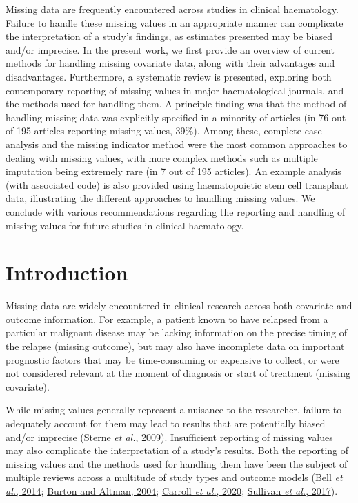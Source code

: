 \documentclass[
  letterpaper,
  DIV=11,
  numbers=noendperiod]{scrreprt}
\begin{document}
Missing data are frequently encountered across studies in clinical
haematology. Failure to handle these missing values in an appropriate
manner can complicate the interpretation of a study's findings, as
estimates presented may be biased and/or imprecise. In the present work,
we first provide an overview of current methods for handling missing
covariate data, along with their advantages and disadvantages.
Furthermore, a systematic review is presented, exploring both
contemporary reporting of missing values in major haematological
journals, and the methods used for handling them. A principle finding
was that the method of handling missing data was explicitly specified in
a minority of articles (in 76 out of 195 articles reporting missing
values, 39\%). Among these, complete case analysis and the missing
indicator method were the most common approaches to dealing with missing
values, with more complex methods such as multiple imputation being
extremely rare (in 7 out of 195 articles). An example analysis (with
associated code) is also provided using haematopoietic stem cell
transplant data, illustrating the different approaches to handling
missing values. We conclude with various recommendations regarding the
reporting and handling of missing values for future studies in clinical
haematology.

\hfill\break

\hypertarget{introduction}{%
\section{Introduction}\label{introduction}}

Missing data are widely encountered in clinical research across both
covariate and outcome information. For example, a patient known to have
relapsed from a particular malignant disease may be lacking information
on the precise timing of the relapse (missing outcome), but may also
have incomplete data on important prognostic factors that may be
time-consuming or expensive to collect, or were not considered relevant
at the moment of diagnosis or start of treatment (missing covariate).

While missing values generally represent a nuisance to the researcher,
failure to adequately account for them may lead to results that are
potentially biased and/or imprecise
(\protect\hyperlink{ref-sterneMultipleImputationMissing2009}{Sterne
\emph{et al.}, 2009}). Insufficient reporting of missing values may also
complicate the interpretation of a study's results. Both the reporting
of missing values and the methods used for handling them have been the
subject of multiple reviews across a multitude of study types and
outcome models (\protect\hyperlink{ref-bellHandlingMissingData2014}{Bell
\emph{et al.}, 2014};
\protect\hyperlink{ref-burtonMissingCovariateData2004}{Burton and
Altman, 2004}; \protect\hyperlink{ref-carrollHowAreMissing2020}{Carroll
\emph{et al.}, 2020};
\protect\hyperlink{ref-sullivanTreatmentMissingData2017}{Sullivan
\emph{et al.}, 2017}).
\end{document}
